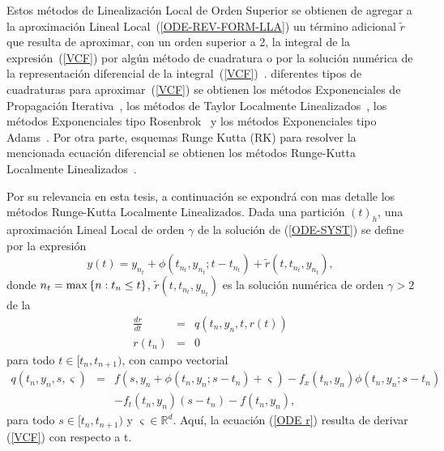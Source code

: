 Estos métodos de Linealización Local de Orden Superior se obtienen de agregar a la aproximación Lineal Local~(\ref{ODE-REV-FORM-LLA}) un término adicional $\widetilde{r}$ que resulta de aproximar, con un orden superior a 2, la integral de la expresión~(\ref{VCF}) por algún método de cuadratura o por la solución numérica de la representación diferencial de la integral~(\ref{VCF})~\cite{delaCruz06}.  diferentes tipos de cuadraturas para aproximar~(\ref{VCF}) se obtienen los métodos Exponenciales de Propagación 
Iterativa~\cite{tokman2006efficient}, los métodos de Taylor Localmente Linealizados~\cite{delaCruz07}, los
métodos Exponenciales tipo Rosenbrok~\cite{hochbruck2009exponential} y los métodos Exponenciales tipo Adams~\cite{hochbruck2011exponential}. Por otra parte,  esquemas Runge Kutta (RK) para resolver la mencionada ecuación diferencial se obtienen los métodos Runge-Kutta Localmente Linealizados~\cite{delaCruz06,Jimenez13,Jimenez14AMC}.

Por su relevancia en esta tesis, a continuación se expondrá con mas detalle los métodos Runge-Kutta Localmente Linealizados. 
Dada una partición $(t)_{h}$, una aproximación Lineal Local de orden $%
\gamma$ de la solución de (\ref{ODE-SYST}) se define por la expresión~\cite{Jimenez13}
\begin{equation}
y(t)=y_{n_{t}}+\phi(t_{n_{t}},y_{n_{t}};t-t_{n_{t}})+\widetilde{r}(t,t_{n_{t}},y_{n_{t}}),
\label{ODE-REV-HOLL}
\end{equation}
donde ${n_{t}=\max\left\{ n:t_{n}\leq t \right\}}$, $\widetilde{r}(t,t_{n_{t}},y_{n_{t}})$ es la solución numérica de orden $\gamma >2$ de la 
\begin{eqnarray}
\frac{dr}{dt} & = & q(t_{n},y_{n},t,r(t))  \label{ODE r} \\
r(t_{n}) & = & 0 \nonumber
\end{eqnarray}
para todo $t\in [t_{n},t_{n+1})$, con campo vectorial 
\begin{eqnarray*}
q(t_n,y_n,s,\varsigma)&=&f(s,y_n+\phi(t_n,y_n;s-t_n)+\varsigma)-f_x(t_n,y_n)\phi(t_n,y_n;s-t_n)\\
 & &-f_t(t_n,y_n)(s-t_n) -f(t_n,y_n) ,
\end{eqnarray*}
para todo $s\in [t_{n},t_{n+1})$ y $\varsigma \in \mathbb{R}^d $. Aquí, la ecuación (\ref{ODE r}) resulta de derivar (\ref{VCF}) con respecto a t. 

